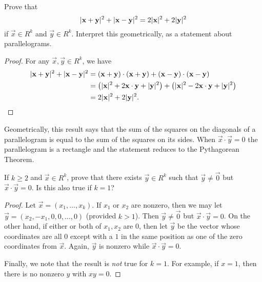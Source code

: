 
 Prove that
\begin{equation*}
  \lvert{\mathbf{x} + \mathbf{y}}\rvert^2 + \lvert{\mathbf{x} - \mathbf{y}}\rvert^2
  = 2\lvert{\mathbf{x}}\rvert^2 + 2\lvert{\mathbf{y}}\rvert^2
\end{equation*}
if $\vec{x}\in R^k$ and $\vec{y}\in R^k$. Interpret this
geometrically, as a statement about parallelograms.
\begin{proof}
  For any $\vec{x},\vec{y}\in R^k$, we have
  \begin{align*}
    \lvert{\mathbf{x} + \mathbf{y}}\rvert^2 + \lvert{\mathbf{x} - \mathbf{y}}\rvert^2
    &= (\mathbf{x} + \mathbf{y})\cdot(\mathbf{x} + \mathbf{y})
      + (\mathbf{x} - \mathbf{y})\cdot(\mathbf{x} - \mathbf{y}) \\
    &= \left(\lvert{\mathbf{x}}\rvert^2 + 2\mathbf{x}\cdot\mathbf{y} + \lvert{\mathbf{y}}\rvert^2\right)
      + \left(\lvert{\mathbf{x}}\rvert^2 - 2\mathbf{x}\cdot\mathbf{y} + \lvert{\mathbf{y}}\rvert^2\right) \\
    &= 2\lvert{\mathbf{x}}\rvert^2 + 2\lvert{\mathbf{y}}\rvert^2. \qedhere
  \end{align*}
\end{proof}

Geometrically, this result says that the sum of the squares on the
diagonals of a parallelogram is equal to the sum of the squares on its
sides. When $\vec{x}\cdot\vec{y} = 0$ the parallelogram is a rectangle
and the statement reduces to the Pythagorean Theorem.

 If $k\geq2$ and $\vec{x}\in R^k$, prove that there
exists $\vec{y}\in R^k$ such that $\vec{y}\neq\vec{0}$ but
$\vec{x}\cdot\vec{y} = 0$. Is this also true if $k = 1$?
\begin{proof}
  Let $\vec{x} = (x_1, \dots, x_k)$. If $x_1$ or $x_2$ are nonzero,
  then we may let $\vec{y} = (x_2, -x_1, 0, 0, \dots, 0)$ (provided
  $k > 1$). Then $\vec{y}\neq\vec{0}$ but $\vec{x}\cdot\vec{y} =
  0$. On the other hand, if either or both of $x_1,x_2$ are $0$, then
  let $\vec{y}$ be the vector whose coordinates are all $0$ except
  with a $1$ in the same position as one of the zero coordinates from
  $\vec{x}$. Again, $\vec{y}$ is nonzero while
  $\vec{x}\cdot\vec{y} = 0$.

  Finally, we note that the result is {\em not} true for $k = 1$. For
  example, if $x = 1$, then there is no nonzero $y$ with $xy = 0$.
\end{proof}

